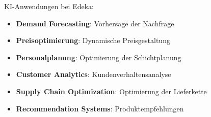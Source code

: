 \begin{otherlanguage}{ngerman}
KI-Anwendungen bei Edeka:
\begin{itemize}
    \item \textbf{Demand Forecasting}: Vorhersage der Nachfrage
    \item \textbf{Preisoptimierung}: Dynamische Preisgestaltung
    \item \textbf{Personalplanung}: Optimierung der Schichtplanung
    \item \textbf{Customer Analytics}: Kundenverhaltensanalyse
    \item \textbf{Supply Chain Optimization}: Optimierung der Lieferkette
    \item \textbf{Recommendation Systems}: Produktempfehlungen
\end{itemize}
\end{otherlanguage}

